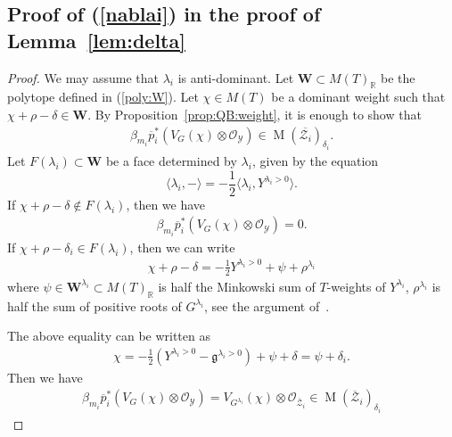 \documentclass [11pt,oneside,a4paper,mathscr]{amsart}
\theoremstyle{definition}
\newcommand{\Y}{\mathcal{Y}}
\newcommand{\MM}{\operatorname{M}}
\newcommand{\fg}{\mathfrak{g}}
\begin{document}
\subsection{Proof of (\ref{nablai}) in the proof of Lemma~\ref{lem:delta}}\label{subsec:nablai}
\begin{proof}
    We may assume that $\lambda_i$ is anti-dominant. 
    Let $\mathbf{W} \subset M(T)_{\mathbb{R}}$ be the polytope defined in (\ref{poly:W}). 
    Let $\chi \in M(T)$ be a dominant weight such that $\chi+\rho-\delta \in \mathbf{W}$.
    By Proposition~\ref{prop:QB:weight}, it is enough to show that 
    \begin{align*}
        \beta_{m_i}\overline{p}_i^{*}(V_G(\chi)\otimes \mathcal{O}_{\Y})\in 
        \MM(\overline{\mathcal{Z}_i})_{\delta_i}.
    \end{align*}
    Let $F(\lambda_i) \subset \mathbf{W}$ be a face determined by $\lambda_i$, given by the equation \[\langle \lambda_i, -\rangle=-\frac{1}{2}\langle \lambda_i, Y^{\lambda_i>0}\rangle.\] 
    If $\chi+\rho-\delta \notin F(\lambda_i)$, then we have 
    \begin{align*}
        \beta_{m_i}\overline{p}_i^{*}(V_G(\chi)\otimes \mathcal{O}_{\Y})=0.
    \end{align*}
    If $\chi+\rho-\delta_i \in F(\lambda_i)$, then we can write 
    \begin{align*}
        \chi+\rho-\delta=-\frac{1}{2}Y^{\lambda_i>0}+\psi+\rho^{\lambda_i}
    \end{align*}
    where 
 $\psi \in \mathbf{W}^{\lambda_i} \subset M(T)_{\mathbb{R}}$ is half the Minkowski sum of 
 $T$-weights of $Y^{\lambda_i}$, 
    $\rho^{\lambda_i}$ is half the sum of positive roots of $G^{\lambda_i}$, 
    see the argument of~\cite[Corollary~3.4]{P}. 
    
    The above equality can be written as 
    \begin{align*}
        \chi=-\frac{1}{2}(Y^{\lambda_i>0}-\fg^{\lambda_i>0})+\psi+\delta=\psi+\delta_i.
    \end{align*}
    Then we have 
    \begin{align*}
        \beta_{m_i}\overline{p}_i^{*}(V_G(\chi)\otimes \mathcal{O}_{\Y})
        =V_{G^{\lambda_i}}(\chi)\otimes \mathcal{O}_{\overline{\mathcal{Z}}_i}
        \in 
        \MM(\overline{\mathcal{Z}}_i)_{\delta_i}
\end{align*}
\end{proof}
\end{document}
